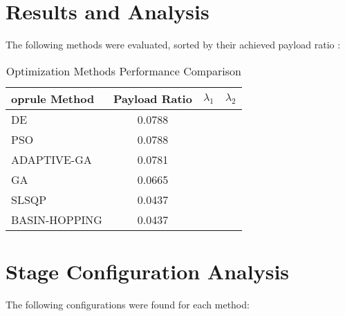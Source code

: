 \documentclass[11pt]{article}
\begin{document}
\section{Results and Analysis}
The following methods were evaluated, sorted by their achieved payload ratio \cite{pso_ascent_2013}:

\begin{table}[H]
\centering
\caption{Optimization Methods Performance Comparison}
\begin{tabular}{lccc}
	oprule
Method & Payload Ratio & $\lambda_{1}$ & $\lambda_{2}$ \\
\midrule
DE & 0.0788 \\
PSO & 0.0788 \\
ADAPTIVE-GA & 0.0781 \\
GA & 0.0665 \\
SLSQP & 0.0437 \\
BASIN-HOPPING & 0.0437 \\
\bottomrule
\end{tabular}
\end{table}

\section{Stage Configuration Analysis}
The following configurations were found for each method:
\end{document}
